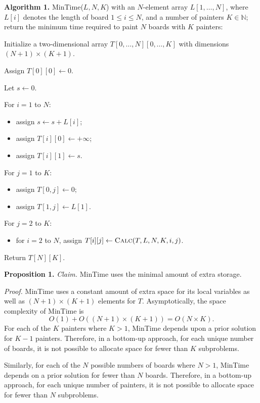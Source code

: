 \begin{enumerate}
\begin{solution}

\textbf{Algorithm 1. }{\sc MinTime}($L,N,K$) with an $N$-element array $L[1,\dots,N]$, where $L[i]$ denotes the length of board $1\leq i\leq N$, and a number of painters $K\in\mathbb{N}$; return the minimum time required to paint $N$ boards with $K$ painters:

Initialize a two-dimensional array $T[0,\dots,N][0,\dots,K]$ with dimensions $(N+1)\times(K+1)$.

Assign $T[0][0]\leftarrow 0$.

Let $s\leftarrow 0$.

For $i=1$ to $N$:
\begin{itemize}
    \item assign $s\leftarrow s+L[i]$;
    \item assign $T[i][0]\leftarrow+\infty$;
    \item assign $T[i][1]\leftarrow s$.
\end{itemize}

For $j=1$ to $K$:
\begin{itemize}
\item assign $T[0,j]\leftarrow 0;$
\item assign $T[1,j]\leftarrow L[1]$.
\end{itemize}

For $j=2$ to $K$:
\begin{itemize}
    \item for $i=2$ to $N$, assign $T[i][j]\leftarrow\textsc{Calc}(T,L,N,K,i,j)$.
\end{itemize}
Return $T[N][K]$.

\textbf{Proposition 1. }\textit{Claim. }{\sc MinTime} uses the minimal amount of extra storage.

\textit{Proof. }{\sc MinTime} uses a constant amount of extra space for its local variables as well as $(N+1)\times(K+1)$ elements for $T$. Asymptotically, the space complexity of {\sc MinTime} is \[O(1)+O((N+1)\times(K+1))=O(N\times K).\]
For each of the $K$ painters where $K>1$, {\sc MinTime} depends upon a prior solution for $K-1$ painters. Therefore, in a bottom-up approach, for each unique number of boards, it is not possible to allocate space for fewer than $K$ subproblems.

Similarly, for each of the $N$ possible numbers of boards where $N>1$, {\sc MinTime} depends on a prior solution for fewer than $N$ boards. Therefore, in a bottom-up approach, for each unique number of painters, it is not possible to allocate space for fewer than $N$ subproblems.


\end{solution}
\end{enumerate}
